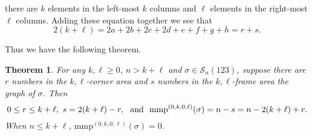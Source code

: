 \documentclass[
final,nomarks
]{dmtcs-episciences}
\newtheorem{theorem}{Theorem}
\newcommand{\Sn}[1]{\mathcal{S}_{#1}}
\newcommand{\mmp}{\mathrm{mmp}}
\begin{document}
there are \begin{math}k\end{math} elements in the left-most \begin{math}k\end{math} columns and \begin{math}\ell\end{math} 
elements in the right-most \begin{math}\ell\end{math} columns. 
Adding these equation together we see that 
\begin{equation}
2(k+\ell) = 2a+2b+2c+2d+e+f+g+h = r +s.
\end{equation}


Thus we have the following theorem.
\begin{theorem}\label{theorem:13}
	For any \begin{math}k,\ell\geq 0\end{math}, \begin{math}n>k+\ell\end{math} and \begin{math}\sigma\in\Sn{n}(123)\end{math}, suppose there are \begin{math}r\end{math} numbers in the \begin{math}k,\ell\end{math}-corner area and \begin{math}s\end{math} numbers in the \begin{math}k,\ell\end{math}-frame area the graph of \begin{math}\sigma\end{math}. Then 
	\begin{equation}
	0\leq r\leq k+\ell, \ s=2(k+\ell)-r,\textnormal{ \ and \ }\mmp^{(0,k,0,\ell)}(\sigma)=n-s=n-2(k+\ell)+r.
	\end{equation}
	When \begin{math}n\leq k+\ell\end{math}, \begin{math}\mmp^{(0,k,0,\ell)}(\sigma)=0\end{math}.
\end{theorem}
\end{document}
